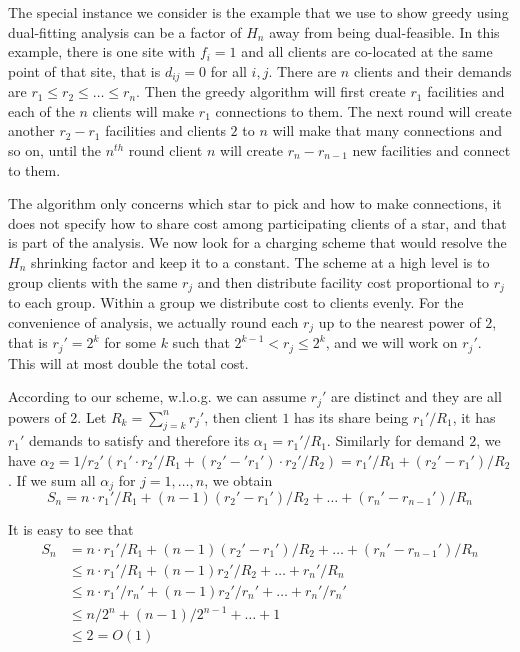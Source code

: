 \documentclass{article}
\begin{document}
The special instance we consider is the example that we use to show
greedy using dual-fitting analysis can be a factor of $H_n$ away from
being dual-feasible. In this example, there is one site with $f_i=1$
and all clients are co-located at the same point of that site, that is
$d_{ij}=0$ for all $i,j$. There are $n$ clients and their demands are
$r_1 \leq r_2 \leq \ldots \leq r_n$. Then the greedy algorithm will
first create $r_1$ facilities and each of the $n$ clients will make
$r_1$ connections to them. The next round will create another $r_2 -
r_1$ facilities and clients $2$ to $n$ will make that many connections
and so on, until the $n^{th}$ round client $n$ will create $r_n -
r_{n-1}$ new facilities and connect to them.

The algorithm only concerns which star to pick and how to make
connections, it does not specify how to share cost among participating
clients of a star, and that is part of the analysis. We now look for a
charging scheme that would resolve the $H_n$ shrinking factor and keep
it to a constant. The scheme at a high level is to group clients with
the same $r_j$ and then distribute facility cost proportional to $r_j$
to each group. Within a group we distribute cost to clients
evenly. For the convenience of analysis, we actually round each $r_j$
up to the nearest power of $2$, that is $r_j'=2^k$ for some $k$ such
that $2^{k-1} < r_j \leq 2^k$, and we will work on $r_j'$. This will
at most double the total cost.

According to our scheme, w.l.o.g. we can assume $r_j'$ are distinct
and they are all powers of 2. Let $R_k = \sum_{j=k}^n r_j'$, then
client $1$ has its share being $r_1'/R_1$, it has $r_1'$ demands to
satisfy and therefore its $\alpha_1 = r_1'/R_1$. Similarly for demand
$2$, we have $\alpha_2 = 1/r_2' (r_1'\cdot r_2'/R_1 +
(r_2'-'r_1')\cdot r_2'/R_2) = r_1'/R_1 + (r_2'-r_1')/R_2$. If we sum
all $\alpha_j$ for $j=1,\ldots,n$, we obtain
\begin{equation}
S_n = n\cdot r_1'/R_1 + (n-1) (r_2'-r_1')/R_2 + \ldots + (r_n' -
r_{n-1}') / R_n
\end{equation}

It is easy to see that
\begin{align*}
S_n &= n\cdot r_1'/R_1 + (n-1) (r_2'-r_1')/R_2 + \ldots + (r_n' -
r_{n-1}') / R_n\\
&\leq n\cdot r_1'/R_1 + (n-1) r_2' / R_2 + \ldots + r_n' / R_n\\
&\leq n\cdot r_1'/r_n' + (n-1) r_2' / r_n' + \ldots + r_n' / r_n'\\
&\leq n/2^n + (n-1)/2^{n-1} + \ldots + 1\\
&\leq 2 = O(1)\\
\end{align*}
\end{document}

